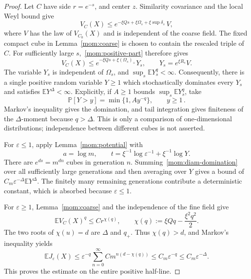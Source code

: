 \documentclass[11pt,letterpaper]{article}
\newcommand{\E}{\mathbb E}
\renewcommand{\P}{\mathbb P}
\newcommand{\eps}{\varepsilon}
\theoremstyle{definition}
\theoremstyle{remark}
\numberwithin{equation}{section}
\begin{document}
\begin{proof}
Let $C$ have side $r=e^{-s}$, and center $z$. Similarity covariance and the local Weyl bound give
\begin{equation*}
 V_C(X)\le
 e^{-\xi Qs+\xi\Omega_s+\xi\sup\delta_s}\,V,
 \end{equation*}
where $V$ has the law of $V_{C_0}(X)$ and is independent of the coarse field.  The fixed compact cube in Lemma~\ref{mom:coarse} is chosen to contain the rescaled triple of $C$.  For sufficiently large $s$,~\eqref{mom:positive-part} therefore gives
\begin{equation}\label{mom:diam-domination}
 V_C(X)\le e^{-\xi Qs+\xi(\Omega_s)_+}Y_s,
 \qquad
 Y_s=e^{\xi R_s}V.
\end{equation}
The variable $Y_s$ is independent of $\Omega_s$, and $\sup_s\E Y_s^q<\infty$. Consequently, there is a single positive random variable $Y\ge1$ which stochastically dominates every $Y_s$ and satisfies $\E Y^\Delta<\infty$. Explicitly, if $A\ge1$ bounds $\sup_s\E Y_s^q$, take
\begin{equation*}
 \P[Y>y]=\min\{1,Ay^{-q}\},\qquad y\ge1\,.
\end{equation*}
Markov's inequality gives the domination, and tail integration gives finiteness of the $\Delta$-moment because $q>\Delta$.  This is only a comparison of one-dimensional distributions; independence between different cubes is not asserted.

For $\eps\le1$, apply Lemma~\ref{mom:potential} with
\begin{equation*}
 a=\log m,\qquad
 t=\xi^{-1}\log\eps^{-1}+\xi^{-1}\log Y.
 \end{equation*}
There are $e^{ds}=m^{dn}$ cubes in generation $n$. Summing~\eqref{mom:diam-domination} over all sufficiently large generations and then averaging over $Y$ gives a bound of $C_m\eps^{-\Delta}\E Y^\Delta$. The finitely many remaining generations contribute a deterministic constant, which is absorbed because $\eps\le1$.

For $\eps\ge1$, Lemma~\ref{mom:coarse} and the independence of the fine field give
\begin{equation}\label{mom:diam-scale}
 \E V_C(X)^q
 \le C r^{\chi(q)},\qquad
 \chi(q):=\xi Qq-\frac{\xi^2q^2}{2}.
\end{equation}
The two roots of $\chi(u)=d$ are $\Delta$ and $q_+$. Thus $\chi(q)>d$, and Markov's inequality yields
\begin{equation*}
 \E J_\eps(X)
 \le \eps^{-q}\sum_{n=0}^{\infty}
        C m^{n(d-\chi(q))}
 \le C_m\eps^{-q}
 \le C_m\eps^{-\Delta}.
 \end{equation*}
This proves the estimate on the entire positive half-line.
\end{proof}
\end{document}
